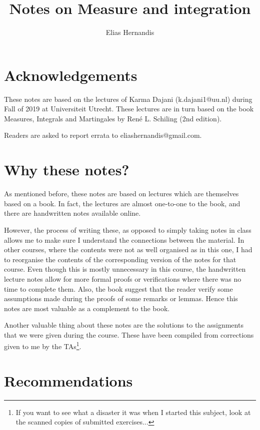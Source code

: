 \documentclass[a4paper]{book}
\author{Elias Hernandis}
\title{Notes on Measure and integration}
\begin{document}
	\maketitle
	
	\section{Acknowledgements}
	
	These notes are based on the lectures of Karma Dajani (k.dajani1@uu.nl) during Fall of 2019 at Universiteit Utrecht. These lectures are in turn based on the book Measures, Integrals and Martingales by René L. Schiling (2nd edition).
	
	Readers are asked to report errata to eliashernandis@gmail.com.
	
	\section{Why these notes?}
	
	As mentioned before, these notes are based on lectures which are themselves based on a book. In fact, the lectures are almost one-to-one to the book, and there are handwritten notes available online.
	
	However, the process of writing these, as opposed to simply taking notes in class allows me to make sure I understand the connections between the material. In other courses, where the contents were not as well organised as in this one, I had to reorganise the contents of the corresponding version of the notes for that course. Even though this is mostly unnecessary in this course, the handwritten lecture notes allow for more formal proofs or verifications where there was no time to complete them. Also, the book suggest that the reader verify some assumptions made during the proofs of some remarks or lemmas. Hence this notes are most valuable as a complement to the book.
	
	Another valuable thing about these notes are the solutions to the assignments that we were given during the course. These have been compiled from corrections given to me by the TAs\footnote{If you want to see what a disaster it was when I started this subject, look at the scanned copies of submitted exercises...}.
	
	\section{Recommendations}
	
\end{document}
